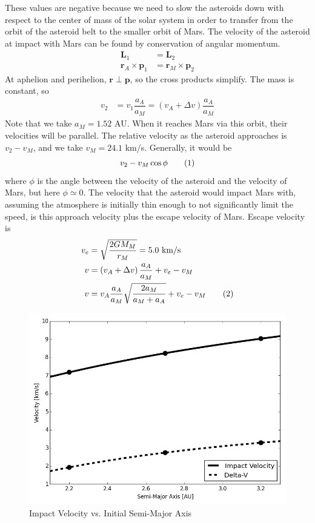 \documentclass[a4paper]{article}
\renewcommand*{\vec}[1]{\bm{#1}} 		%
\newcommand\numberthis{\addtocounter{equation}{1}\tag{\theequation}}
\begin{document}
	These values are negative because we need to slow the asteroids down with respect to the center of mass of the solar system in order to transfer from the orbit of the asteroid belt to the smaller orbit of Mars. The velocity of the asteroid at impact with Mars can be found by conservation of angular momentum.
	\begin{align*}
	\vec{L}_1 &= \vec{L}_2 \\
	\vec{r}_A \times \vec{p}_1 &= \vec{r}_M \times \vec{p}_2
	\end{align*}
	At aphelion and perihelion, $\vec{r} \perp \vec{p}$, so the cross products simplify. The mass is constant, so
	\begin{align*}
	v_2 &= v_1 \dfrac{a_A}{a_M} = \left(v_A + \Delta v\right) \dfrac{a_A}{a_M}
	\end{align*}
	Note that we take $a_M = 1.52$ AU. When it reaches Mars via this orbit, their velocities will be parallel. The relative velocity as the asteroid approaches is $v_2 - v_M$, and we take $v_M = 24.1$ km/s. Generally, it would be
	\[v_2 - v_M \cos\phi \numberthis \label{gen1}\]
	where $\phi$ is the angle between the velocity of the asteroid and the velocity of Mars, but here $\phi \simeq 0$. The velocity that the asteroid would impact Mars with, assuming the atmosphere is initially thin enough to not significantly limit the speed, is this approach velocity plus the escape velocity of Mars. Escape velocity is
	\begin{align*}
	v_e &= \sqrt{\dfrac{2G M_M}{r_M}} = 5.0 \text{ km/s} \\
	v &= \left(v_A + \Delta v\right) \dfrac{a_A}{a_M} + v_e - v_M \\
	v &= v_A \dfrac{a_A}{a_M} \sqrt{\dfrac{2a_M}{a_M + a_A}} + v_e - v_M \numberthis \label{impact}
	\end{align*}
	
	\begin{figure}[ht]
		\centering
		\includegraphics[scale=0.5]{velocity2.png}
		\caption{Impact Velocity vs. Initial Semi-Major Axis}
		\label{fig:vel2}
	\end{figure} \[\]
	
\end{document}
